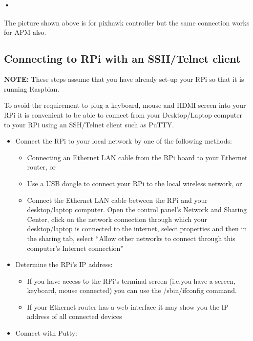 \documentclass[11pt,a4paper]{article}
\begin{document}
	\paragraph{•} The picture shown above is for pixhawk controller but the same connection works for APM also.
	 \subsection{Connecting to RPi with an SSH/Telnet client}
	 \textbf{NOTE:} These steps assume that you have already set-up your RPi so that it is running Raspbian.

To avoid the requirement to plug a keyboard, mouse and HDMI screen into your RPi it is convenient to be able to connect from your Desktop/Laptop computer to your RPi using an SSH/Telnet client such as PuTTY.
	 \begin{itemize}
	 	\item Connect the RPi to your local network by one of the following methods:
			\begin{itemize}
				\item Connecting an Ethernet LAN cable from the RPi board to your Ethernet router, or
				\item Use a USB dongle to connect your RPi to the local wireless network, or
				\item Connect the Ethernet LAN cable between the RPi and your desktop/laptop computer. Open the control panel’s Network and Sharing Center, click on the network connection through which your desktop/laptop is connected to the internet, select properties and then in the sharing tab, select “Allow other networks to connect through this computer’s Internet connection”
\end{itemize}
	\item Determine the RPi’s IP address:
	\begin{itemize}
		\item If you have access to the RPi’s terminal screen (i.e.you have a screen, keyboard, mouse connected) you can use the /sbin/ifconfig command.
		\item If your Ethernet router has a web interface it may show you the IP address of all connected devices
	\end{itemize}
	\item Connect with Putty:
		\begin{figure}[H]
	 	\centering

\end{figure}
\end{itemize}
\end{document}
